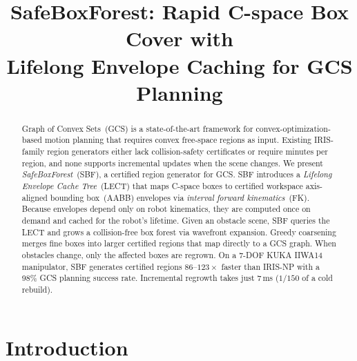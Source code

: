 \documentclass[letterpaper, conference]{IEEEtran}
\begin{document}
\title{\vspace{18pt}SafeBoxForest: Rapid C-space Box Cover with\\
Lifelong Envelope Caching for GCS Planning}

\author{
}
\maketitle

\begin{abstract}
Graph of Convex Sets~(GCS) is a state-of-the-art framework for
convex-optimization-based motion planning that requires convex
free-space regions as input.
Existing IRIS-family region generators either lack collision-safety
certificates or require minutes per region, and none supports
incremental updates when the scene changes.
We present \emph{SafeBoxForest}~(SBF), a certified region generator
for GCS.
SBF introduces a \emph{Lifelong Envelope Cache Tree}~(LECT) that
maps C-space boxes to certified workspace
axis-aligned bounding box~(AABB) envelopes via
\emph{interval forward kinematics}~(FK).
Because envelopes depend only on robot kinematics,
they are computed once on demand and cached for the robot's lifetime.
Given an obstacle scene, SBF queries the LECT and grows a
collision-free box forest via wavefront expansion.
Greedy coarsening merges fine boxes into larger certified regions
that map directly to a GCS graph.
When obstacles change, only the affected boxes are regrown.
On a 7-DOF KUKA IIWA14 manipulator, SBF generates certified regions
$86$--$123\times$ faster than IRIS-NP with a 98\% GCS planning
success rate.
Incremental regrowth takes just $7$\,ms ($1/150$ of a cold rebuild).
\end{abstract}

\section{Introduction}\label{sec:intro}
\end{document}
